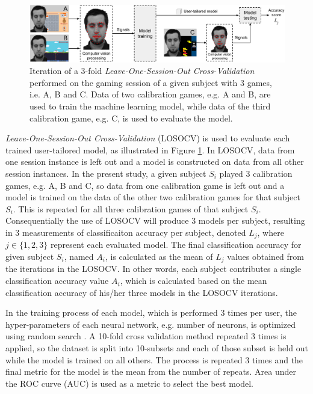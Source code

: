 \begin{figure}[ht]
    \centering
    \includegraphics[width=\textwidth]{Content/figures/machine-learning-investigation}
    \caption{Iteration of a 3-fold \textit{Leave-One-Session-Out Cross-Validation} performed on the gaming session of a given subject with 3 games, i.e. A, B and C. Data of two calibration games, e.g. A and B, are used to train the machine learning model, while data of the third calibration game, e.g. C, is used to evaluate the model.}
    \label{fig:study5-training-evaluation}
\end{figure}

\textit{Leave-One-Session-Out Cross-Validation} (LOSOCV) is used to evaluate each trained user-tailored model, as illustrated in Figure \ref{fig:study5-training-evaluation}. In LOSOCV, data from one session instance is left out and a model is constructed on data from all other session instances. In the present study, a given subject $S_i$ played 3 calibration games, e.g. A, B and C, so data from one calibration game is left out and a model is trained on the data of the other two calibration games for that subject $S_i$. This is repeated for all three calibration games of that subject $S_i$. Consequentially the use of LOSOCV will produce 3 models per subject, resulting in 3 measurements of classificaiton accuracy per subject, denoted $L_j$, where $j \in \{1, 2, 3\}$ represent each evaluated model. The final classification accuracy for given subject $S_i$, named $A_i$, is calculated as the mean of $L_j$ values obtained from the iterations in the LOSOCV. In other words, each subject contributes a single classification accuracy value $A_i$, which is calculated based on the mean classification accuracy of his/her three models in the LOSOCV iterations.

In the training process of each model, which is performed 3 times per user, the hyper-parameters of each neural network, e.g. number of neurons, is optimized using random search \parencite{bergstra2012random}. A 10-fold cross validation method repeated 3 times is applied, so the dataset is split into 10-subsets and each of those subset is held out while the model is trained on all others. The process is repeated 3 times and the final metric for the model is the mean from the number of repeats. Area under the ROC curve (AUC) is used as a metric to select the best model.

